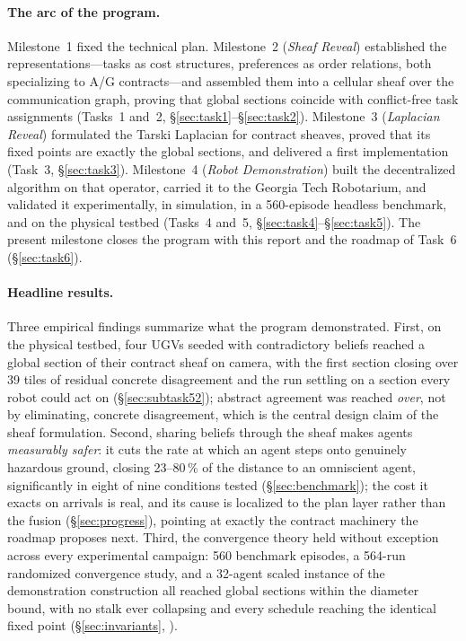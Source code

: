 \documentclass[11pt]{article}
\theoremstyle{definition}
\theoremstyle{remark}
\begin{document}
\paragraph{The arc of the program.}
Milestone~1 fixed the technical plan.
Milestone~2 (\emph{Sheaf Reveal}) established the representations---tasks as cost structures,
preferences as order relations, both specializing to A/G contracts---and assembled them into a
cellular sheaf over the communication graph, proving that global sections coincide with
conflict-free task assignments (Tasks~1 and~2, \S\ref{sec:task1}--\S\ref{sec:task2}).
Milestone~3 (\emph{Laplacian Reveal}) formulated the Tarski Laplacian for contract sheaves,
proved that its fixed points are exactly the global sections, and delivered a first
implementation (Task~3, \S\ref{sec:task3}).
Milestone~4 (\emph{Robot Demonstration}) built the decentralized algorithm on that operator,
carried it to the Georgia Tech Robotarium, and validated it experimentally, in simulation, in a
560-episode headless benchmark, and on the physical testbed (Tasks~4 and~5,
\S\ref{sec:task4}--\S\ref{sec:task5}).
The present milestone closes the program with this report and the roadmap of Task~6
(\S\ref{sec:task6}).

\paragraph{Headline results.}
Three empirical findings summarize what the program demonstrated.
First, on the physical testbed, four UGVs seeded with contradictory beliefs reached a global
section of their contract sheaf on camera, with the first section closing over 39 tiles of
residual concrete disagreement and the run settling on a section every robot could act on
(\S\ref{sec:subtask52}); abstract agreement was reached \emph{over}, not by eliminating,
concrete disagreement, which is the central design claim of the sheaf formulation.
Second, sharing beliefs through the sheaf makes agents \emph{measurably safer}: it cuts the
rate at which an agent steps onto genuinely hazardous ground, closing 23--80\,\% of the
distance to an omniscient agent, significantly in eight of nine conditions tested
(\S\ref{sec:benchmark}); the cost it exacts on arrivals is real, and its cause is localized to
the plan layer rather than the fusion (\S\ref{sec:progress}), pointing at exactly the contract
machinery the roadmap proposes next.
Third, the convergence theory held without exception across every experimental campaign: 560
benchmark episodes, a 564-run randomized convergence study, and a 32-agent scaled instance of
the demonstration construction all reached global sections within the diameter bound, with no
stalk ever collapsing and every schedule reaching the identical fixed point
(\S\ref{sec:invariants}, ).
\end{document}
